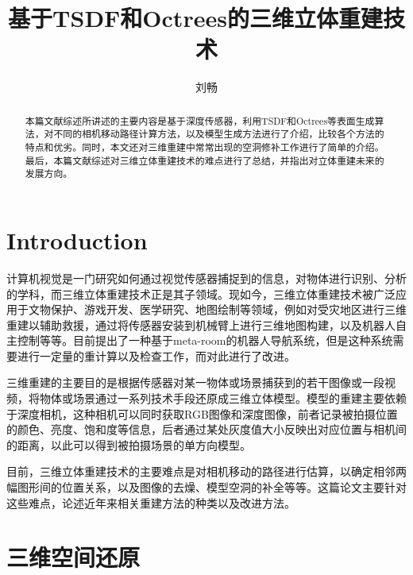 \documentclass{llncs}
\begin{document}
\begin{CJK}{UTF8}{song}
\title{基于TSDF和Octrees的三维立体重建技术}
\author{刘畅}
\maketitle

\begin{abstract}
本篇文献综述所讲述的主要内容是基于深度传感器，利用TSDF和Octrees等表面生成算法，对不同的相机移动路径计算方法，以及模型生成方法进行了介绍，比较各个方法的特点和优劣。同时，本文还对三维重建中常常出现的空洞修补工作进行了简单的介绍。最后，本篇文献综述对三维立体重建技术的难点进行了总结，并指出对立体重建未来的发展方向。
\end{abstract}

\section{Introduction}

计算机视觉是一门研究如何通过视觉传感器捕捉到的信息，对物体进行识别、分析的学科，而三维立体重建技术正是其子领域。现如今，三维立体重建技术被广泛应用于文物保护、游戏开发、医学研究、地图绘制等领域，例如对受灾地区进行三维重建以辅助救援\cite{DBLP:journals/mta/VerykokouIADA18}，通过将传感器安装到机械臂上进行三维地图构建\cite{DBLP:journals/access/BanerjeeYA18}，以及机器人自主控制\cite{DBLP:journals/jfr/LinGQGLWYS18,DBLP:conf/iros/WagnerFB14}等等。目前\cite{DBLP:journals/ral/FaulhammerABZFH17}提出了一种基于meta-room\cite{DBLP:conf/iros/AmbrusBFJ14}的机器人导航系统，但是这种系统需要进行一定量的重计算以及检查工作，而\cite{DBLP:conf/icra/FehrFDSGSC17}对此进行了改进。

三维重建的主要目的是根据传感器对某一物体或场景捕获到的若干图像或一段视频，将物体或场景通过一系列技术手段还原成三维立体模型。模型的重建主要依赖于深度相机，这种相机可以同时获取RGB图像和深度图像，前者记录被拍摄位置的颜色、亮度、饱和度等信息，后者通过某处灰度值大小反映出对应位置与相机间的距离，以此可以得到被拍摄场景的单方向模型。

目前，三维立体重建技术的主要难点是对相机移动的路径进行估算，以确定相邻两幅图形间的位置关系，以及图像的去燥、模型空洞的补全等等。这篇论文主要针对这些难点，论述近年来相关重建方法的种类以及改进方法。

\section{三维空间还原}


\end{CJK}
\end{document}
